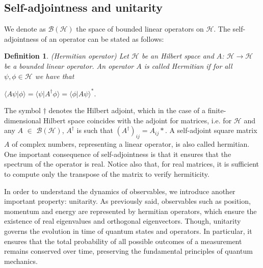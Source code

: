 \documentclass{Configuration_Files/PoliMi3i_thesis}
\newtheorem{definition}{Definition}[chapter]
\begin{document}
\subsection{Self-adjointness and unitarity}

We denote as $\mathscr{B}(\mathscr{H})$ the space of bounded linear operators on $\mathscr{H}$.
The self-adjointness of an operator can be stated as follows:

\begin{definition} (Hermitian operator) Let $\mathscr{H}$ be an Hilbert space and  $A$: $\mathscr{H} \rightarrow \mathscr{H}$ be a bounded linear operator. An operator $A$ is called Hermitian if for all $\psi,\phi \in \mathscr{H}$ we have that
\end{definition}

\begin{center}
	$\langle A\psi|\phi \rangle = \langle \psi|A^{\dagger}\phi \rangle = \langle \phi|A\psi \rangle^{*}$.
\end{center}

The symbol $\dagger$ denotes the Hilbert adjoint, which in the case of a finite-dimensional Hilbert space coincides with  the adjoint for matrices, i.e. for $\mathscr{H}$ and any $A$ $\in$ $\mathscr{B}(\mathscr{H})$, $A^{\dagger}$ is such that $(A^{\dagger})_{ij}=A_{ij}*$. A self-adjoint square matrix $A$ of complex numbers, representing a linear operator, is also called hermitian. One important consequence of self-adjointness is that it ensures that the spectrum of the operator is real. Notice also that, for real matrices, it is sufficient to compute only the transpose of the matrix to verify hermiticity. \newline

In order to understand the dynamics of observables, we introduce another important property: unitarity. 
As previously said, observables such as position, momentum and energy are represented by hermitian operators, which ensure the existence of real eigenvalues and orthogonal eigenvectors. Though, unitarity governs the evolution in time of quantum states and operators. In particular, it ensures that the total probability of all possible outcomes of a measurement remains conserved over time, preserving the fundamental principles of quantum mechanics. 
\end{document}
